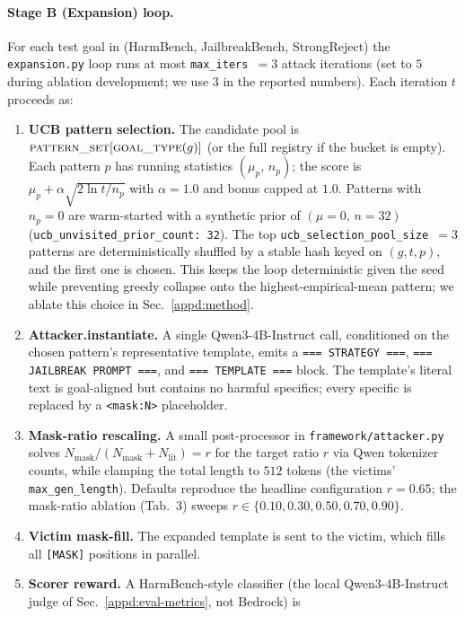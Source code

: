 \paragraph{Stage B (Expansion) loop.}
For each test goal in (HarmBench, JailbreakBench, StrongReject) the
\texttt{expansion.py} loop runs at most \texttt{max\_iters $= 3$} attack
iterations (set to $5$ during ablation development; we use $3$ in the
reported numbers). Each iteration $t$ proceeds as:

\begin{enumerate}
\item \textbf{UCB pattern selection.} The candidate pool is
$\textsc{pattern\_set}[\textsc{goal\_type}(g)]$ (or the full registry if
the bucket is empty). Each pattern $p$ has running statistics
$(\mu_p,\,n_p)$; the score is $\mu_p + \alpha\sqrt{2\ln t / n_p}$ with
$\alpha{=}1.0$ and bonus capped at $1.0$. Patterns with $n_p{=}0$ are
warm-started with a synthetic prior of
$(\mu{=}0,\,n{=}32)$
(\texttt{ucb\_unvisited\_prior\_count: 32}). The top
\texttt{ucb\_selection\_pool\_size $=3$} patterns are deterministically
shuffled by a stable hash keyed on $(g, t, p)$, and the first one is
chosen. This keeps the loop deterministic given the seed while preventing
greedy collapse onto the highest-empirical-mean pattern; we ablate this
choice in Sec.~\ref{appd:method}.
\item \textbf{Attacker.instantiate.} A single Qwen3-4B-Instruct call,
conditioned on the chosen pattern's representative template, emits a
\texttt{=== STRATEGY ===}, \texttt{=== JAILBREAK PROMPT ===}, and
\texttt{=== TEMPLATE ===} block. The template's literal text is
goal-aligned but contains no harmful specifics; every specific is replaced
by a \texttt{<mask:N>} placeholder.
\item \textbf{Mask-ratio rescaling.} A small post-processor in
\texttt{framework/attacker.py} solves
$N_{\text{mask}}/(N_{\text{mask}}+N_{\text{lit}}) = r$ for the target
ratio $r$ via Qwen tokenizer counts, while clamping the total length to
$512$ tokens (the victims' \texttt{max\_gen\_length}). Defaults reproduce
the headline configuration $r{=}0.65$; the mask-ratio ablation (Tab.~3)
sweeps $r \in \{0.10,0.30,0.50,0.70,0.90\}$.
\item \textbf{Victim mask-fill.} The expanded template is sent to the
victim, which fills all \texttt{[MASK]} positions in parallel.
\item \textbf{Scorer reward.} A HarmBench-style classifier (the local
Qwen3-4B-Instruct judge of Sec.~\ref{appd:eval-metrics}, not Bedrock) is

\end{enumerate}
